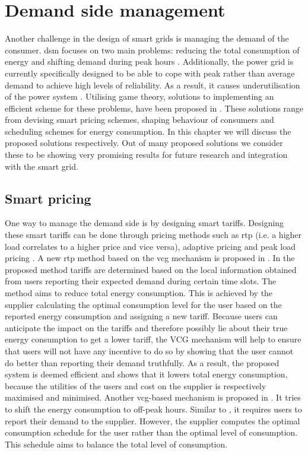 \section{Demand side management}\label{dsm}
\acresetall
Another challenge in the design of smart grids is managing the demand of the consumer. \ac{dsm} focuses on two main problems: reducing the total consumption of energy and shifting demand during peak hours \cite{keypaper}. Additionally, the power grid is currently specifically designed to be able to cope with peak rather than average demand to achieve high levels of reliability. As a result, it causes underutilisation of the power system \cite{MaDengSongEtAl2014}. Utilising game theory, solutions to implementing an efficient scheme for these problems, have been proposed in \cite{SamadiMohsenian-RadSchoberEtAl2012, SamadiSchoberWong2011, MaDengSongEtAl2014, MaharjanZhuZhangEtAl2013, ChenKishoreSnyder2011, ChenLiLowEtAl2010, Mohsenian-RadWongJatskevichEtAl2010a, SalinasLiLi2013, CaronKesidis2010, DepuruWangDevabhaktuni2011a}. These solutions range from devising smart pricing schemes, shaping behaviour of consumers and scheduling schemes for energy consumption. In this chapter we will discuss the proposed solutions respectively. Out of many proposed solutions we consider these to be showing very promising results for future research and integration with the smart grid.

\subsection{Smart pricing}
One way to manage the demand side is by designing smart tariffs. Designing these smart tariffs can be done through pricing methods such as \ac{rtp} (i.e. a higher load correlates to a higher price and vice versa), adaptive pricing and peak load pricing \cite{SamadiMohsenian-RadSchoberEtAl2012}. A new \ac{rtp} method based on the \ac{vcg} mechanism is proposed in \cite{SamadiMohsenian-RadSchoberEtAl2012}. In the proposed method tariffs are determined based on the local information obtained from users reporting their expected demand during certain time slots. The method aims to reduce total energy consumption. This is achieved by the supplier calculating the optimal consumption level for the user based on the reported energy consumption and assigning a new tariff. Because users can anticipate the impact on the tariffs and therefore possibly lie about their true energy consumption to get a lower tariff, the VCG mechanism will help to ensure that users will not have any incentive to do so by showing that the user cannot do better than reporting their demand truthfully. As a result, the proposed system is deemed efficient and shows that it lowers total energy consumption, because the utilities of the users and cost on the supplier is respectively maximised and minimised. Another \ac{vcg}-based mechanism is proposed in \cite{SamadiSchoberWong2011}. It tries to shift the energy consumption to off-peak hours. Similar to \cite{SamadiMohsenian-RadSchoberEtAl2012}, it requires users to report their demand to the supplier. However, the supplier computes the optimal consumption schedule for the user rather than the optimal level of consumption. This schedule aims to balance the total level of consumption.

